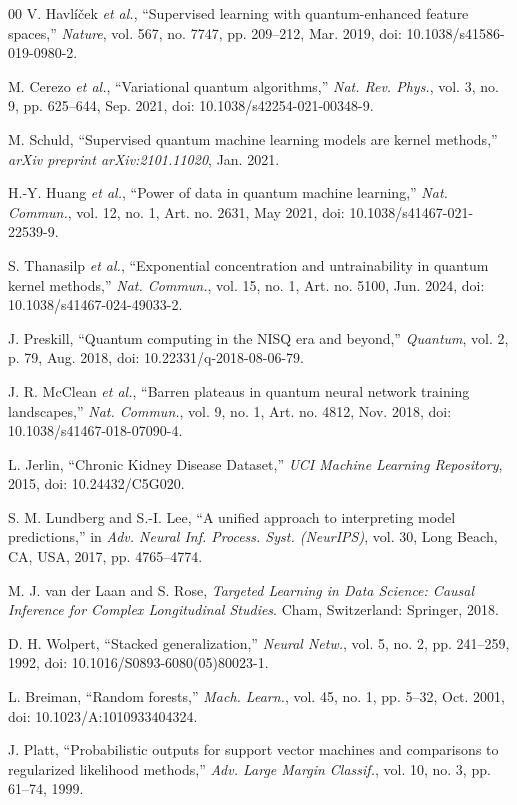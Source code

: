\documentclass[10pt,conference]{IEEEtran}
\begin{document}
{\begin{thebibliography}{00}
V. Havl{\'i}{\v{c}}ek \emph{et al.}, ``Supervised learning with quantum-enhanced feature spaces,'' \emph{Nature}, vol. 567, no. 7747, pp. 209--212, Mar. 2019, doi: 10.1038/s41586-019-0980-2.

M. Cerezo \emph{et al.}, ``Variational quantum algorithms,'' \emph{Nat. Rev. Phys.}, vol. 3, no. 9, pp. 625--644, Sep. 2021, doi: 10.1038/s42254-021-00348-9.

M. Schuld, ``Supervised quantum machine learning models are kernel methods,'' \emph{arXiv preprint arXiv:2101.11020}, Jan. 2021.

H.-Y. Huang \emph{et al.}, ``Power of data in quantum machine learning,'' \emph{Nat. Commun.}, vol. 12, no. 1, Art. no. 2631, May 2021, doi: 10.1038/s41467-021-22539-9.

S. Thanasilp \emph{et al.}, ``Exponential concentration and untrainability in quantum kernel methods,'' \emph{Nat. Commun.}, vol. 15, no. 1, Art. no. 5100, Jun. 2024, doi: 10.1038/s41467-024-49033-2.

J. Preskill, ``Quantum computing in the NISQ era and beyond,'' \emph{Quantum}, vol. 2, p. 79, Aug. 2018, doi: 10.22331/q-2018-08-06-79.

J. R. McClean \emph{et al.}, ``Barren plateaus in quantum neural network training landscapes,'' \emph{Nat. Commun.}, vol. 9, no. 1, Art. no. 4812, Nov. 2018, doi: 10.1038/s41467-018-07090-4.

L. Jerlin, ``Chronic Kidney Disease Dataset,'' \emph{UCI Machine Learning Repository}, 2015, doi: 10.24432/C5G020.

S. M. Lundberg and S.-I. Lee, ``A unified approach to interpreting model predictions,'' in \emph{Adv. Neural Inf. Process. Syst. (NeurIPS)}, vol. 30, Long Beach, CA, USA, 2017, pp. 4765--4774.

M. J. van der Laan and S. Rose, \emph{Targeted Learning in Data Science: Causal Inference for Complex Longitudinal Studies}. Cham, Switzerland: Springer, 2018.

D. H. Wolpert, ``Stacked generalization,'' \emph{Neural Netw.}, vol. 5, no. 2, pp. 241--259, 1992, doi: 10.1016/S0893-6080(05)80023-1.

L. Breiman, ``Random forests,'' \emph{Mach. Learn.}, vol. 45, no. 1, pp. 5--32, Oct. 2001, doi: 10.1023/A:1010933404324.

J. Platt, ``Probabilistic outputs for support vector machines and comparisons to regularized likelihood methods,'' \emph{Adv. Large Margin Classif.}, vol. 10, no. 3, pp. 61--74, 1999.

\end{thebibliography}
}
\end{document}
